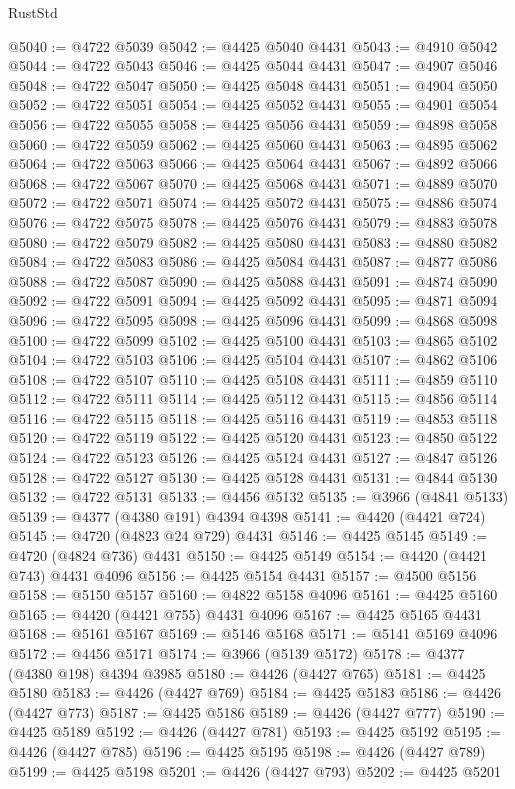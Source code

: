 \begin{lexlean}{RustStd}
\begin{coremodule}
@5040 := @4722 @5039
@5042 := @4425 @5040 @4431
@5043 := @4910 @5042
@5044 := @4722 @5043
@5046 := @4425 @5044 @4431
@5047 := @4907 @5046
@5048 := @4722 @5047
@5050 := @4425 @5048 @4431
@5051 := @4904 @5050
@5052 := @4722 @5051
@5054 := @4425 @5052 @4431
@5055 := @4901 @5054
@5056 := @4722 @5055
@5058 := @4425 @5056 @4431
@5059 := @4898 @5058
@5060 := @4722 @5059
@5062 := @4425 @5060 @4431
@5063 := @4895 @5062
@5064 := @4722 @5063
@5066 := @4425 @5064 @4431
@5067 := @4892 @5066
@5068 := @4722 @5067
@5070 := @4425 @5068 @4431
@5071 := @4889 @5070
@5072 := @4722 @5071
@5074 := @4425 @5072 @4431
@5075 := @4886 @5074
@5076 := @4722 @5075
@5078 := @4425 @5076 @4431
@5079 := @4883 @5078
@5080 := @4722 @5079
@5082 := @4425 @5080 @4431
@5083 := @4880 @5082
@5084 := @4722 @5083
@5086 := @4425 @5084 @4431
@5087 := @4877 @5086
@5088 := @4722 @5087
@5090 := @4425 @5088 @4431
@5091 := @4874 @5090
@5092 := @4722 @5091
@5094 := @4425 @5092 @4431
@5095 := @4871 @5094
@5096 := @4722 @5095
@5098 := @4425 @5096 @4431
@5099 := @4868 @5098
@5100 := @4722 @5099
@5102 := @4425 @5100 @4431
@5103 := @4865 @5102
@5104 := @4722 @5103
@5106 := @4425 @5104 @4431
@5107 := @4862 @5106
@5108 := @4722 @5107
@5110 := @4425 @5108 @4431
@5111 := @4859 @5110
@5112 := @4722 @5111
@5114 := @4425 @5112 @4431
@5115 := @4856 @5114
@5116 := @4722 @5115
@5118 := @4425 @5116 @4431
@5119 := @4853 @5118
@5120 := @4722 @5119
@5122 := @4425 @5120 @4431
@5123 := @4850 @5122
@5124 := @4722 @5123
@5126 := @4425 @5124 @4431
@5127 := @4847 @5126
@5128 := @4722 @5127
@5130 := @4425 @5128 @4431
@5131 := @4844 @5130
@5132 := @4722 @5131
@5133 := @4456 @5132
@5135 := @3966 (@4841 @5133)
@5139 := @4377 (@4380 @191) @4394 @4398
@5141 := @4420 (@4421 @724)
@5145 := @4720 (@4823 @24 @729) @4431
@5146 := @4425 @5145
@5149 := @4720 (@4824 @736) @4431
@5150 := @4425 @5149
@5154 := @4420 (@4421 @743) @4431 @4096
@5156 := @4425 @5154 @4431
@5157 := @4500 @5156
@5158 := @5150 @5157
@5160 := @4822 @5158 @4096
@5161 := @4425 @5160
@5165 := @4420 (@4421 @755) @4431 @4096
@5167 := @4425 @5165 @4431
@5168 := @5161 @5167
@5169 := @5146 @5168
@5171 := @5141 @5169 @4096
@5172 := @4456 @5171
@5174 := @3966 (@5139 @5172)
@5178 := @4377 (@4380 @198) @4394 @3985
@5180 := @4426 (@4427 @765)
@5181 := @4425 @5180
@5183 := @4426 (@4427 @769)
@5184 := @4425 @5183
@5186 := @4426 (@4427 @773)
@5187 := @4425 @5186
@5189 := @4426 (@4427 @777)
@5190 := @4425 @5189
@5192 := @4426 (@4427 @781)
@5193 := @4425 @5192
@5195 := @4426 (@4427 @785)
@5196 := @4425 @5195
@5198 := @4426 (@4427 @789)
@5199 := @4425 @5198
@5201 := @4426 (@4427 @793)
@5202 := @4425 @5201

\end{coremodule}
\end{lexlean}

